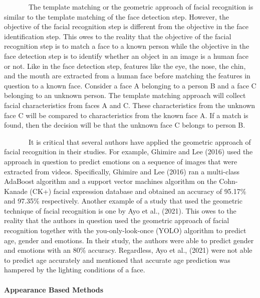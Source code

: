 \documentclass[
  12pt,
]{article}
\begin{document}
~~~~~~~The template matching or the geometric approach of facial
recognition is similar to the template matching of the face detection
step. However, the objective of the facial recognition step is different
from the objective in the face identification step. This owes to the
reality that the objective of the facial recognition step is to match a
face to a known person while the objective in the face detection step is
to identify whether an object in an image is a human face or not. Like
in the face detection step, features like the eye, the nose, the chin,
and the mouth are extracted from a human face before matching the
features in question to a known face. Consider a face A belonging to a
person B and a face C belonging to an unknown person. The template
matching approach will collect facial characteristics from faces A and
C. These characteristics from the unknown face C will be compared to
characteristics from the known face A. If a match is found, then the
decision will be that the unknown face C belongs to person B.

~~~~~~~It is critical that several authors have applied the geometric
approach of facial recognition in their studies. For example, Ghimire
and Lee (2016) used the approach in question to predict emotions on a
sequence of images that were extracted from videos. Specifically,
Ghimire and Lee (2016) ran a multi-class AdaBoost algorithm and a
support vector machines algorithm on the Cohn-Kanade (CK+) facial
expression database and obtained an accuracy of 95.17\% and 97.35\%
respectively. Another example of a study that used the geometric
technique of facial recognition is one by Ayo et al., (2021). This owes
to the reality that the authors in question used the geometric approach
of facial recognition together with the you-only-look-once (YOLO)
algorithm to predict age, gender and emotions. In their study, the
authors were able to predict gender and emotions with an 80\% accuracy.
Regardless, Ayo et al., (2021) were not able to predict age accurately
and mentioned that accurate age prediction was hampered by the lighting
conditions of a face.

\paragraph{\texorpdfstring{Appearance Based Methods\\
}{Appearance Based Methods }}\label{appearance-based-methods}
\end{document}
